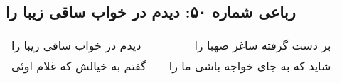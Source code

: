 \begin{center}
\section*{رباعی شماره ۵۰: دیدم در خواب ساقی زیبا را}
\label{sec:0050}
\begin{longtable}{l p{0.5cm} r}
دیدم در خواب ساقی زیبا را
&&
بر دست گرفته ساغر صهبا را
\\
گفتم به خیالش که غلام اوئی
&&
شاید که به جای خواجه باشی ما را
\\
\end{longtable}
\end{center}

